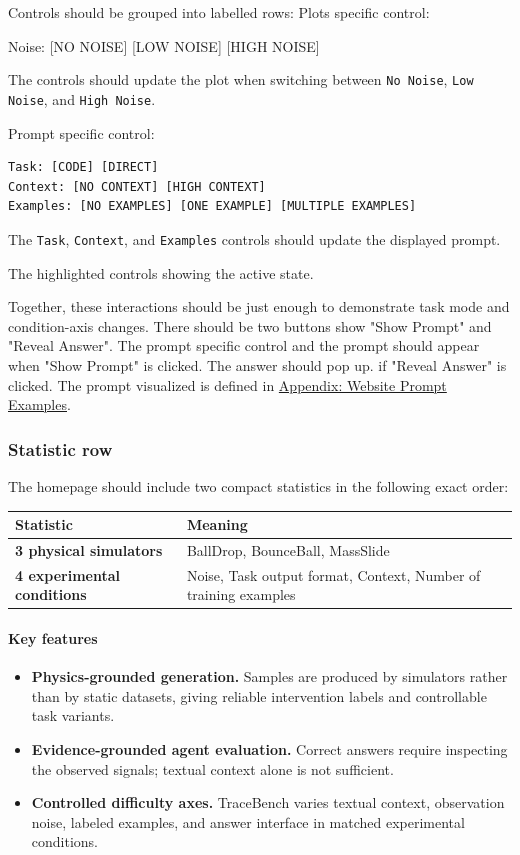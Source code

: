 \documentclass[11pt]{article}
\begin{document}
Controls should be grouped into labelled rows:
Plots specific control:
\begin{DocCode}
  Noise: [NO NOISE] [LOW NOISE] [HIGH NOISE]
\end{DocCode}
The controls should update the plot when switching between \texttt{No Noise}, \texttt{Low Noise}, and \texttt{High Noise}.

Prompt specific control:
\begin{verbatim}
Task: [CODE] [DIRECT]
Context: [NO CONTEXT] [HIGH CONTEXT]
Examples: [NO EXAMPLES] [ONE EXAMPLE] [MULTIPLE EXAMPLES]
\end{verbatim}
The \texttt{Task}, \texttt{Context}, and \texttt{Examples} controls should update the displayed prompt.

The highlighted controls showing the active state.

Together, these interactions should be just enough to demonstrate task mode and condition-axis changes.
There should be two buttons show "Show Prompt" and "Reveal Answer".
The prompt specific control and the prompt should appear when "Show Prompt" is clicked.
The answer should pop up. if "Reveal Answer" is clicked.
The prompt visualized is defined in \hyperref[sec:website-prompt-appendix]{Appendix: Website Prompt Examples}.

\subsubsection*{Statistic row}

The homepage should include two compact statistics in the following exact order:

\begin{center}
\begin{tabular}{ll}
\hline
\textbf{Statistic} & \textbf{Meaning} \\
\hline
\textbf{3 physical simulators} & BallDrop, BounceBall, MassSlide \\
\textbf{4 experimental conditions} & Noise, Task output format, Context, Number of training examples \\
\hline
\end{tabular}
\end{center}



\paragraph{Key features}
\begin{itemize}
  \item \textbf{Physics-grounded generation.} Samples are produced by simulators rather than by static datasets, giving reliable intervention labels and controllable task variants.
  \item \textbf{Evidence-grounded agent evaluation.} Correct answers require inspecting the observed signals; textual context alone is not sufficient.
  \item \textbf{Controlled difficulty axes.} TraceBench varies textual context, observation noise, labeled examples, and answer interface in matched experimental conditions.
\end{itemize}
\end{document}
